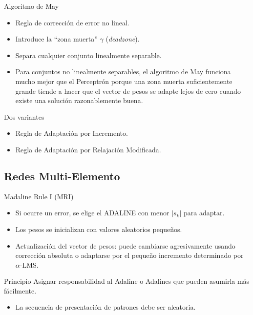 \documentclass[aspectratio=169,utf8,spanish]{beamer}
\begin{document}
\begin{frame}{Algoritmo de May}
  \begin{itemize}
    \item Regla de corrección de error no lineal.
    \item Introduce la ``zona muerta'' $\gamma$ (\textit{deadzone}).
    \item Separa cualquier conjunto linealmente separable.
    \item Para conjuntos no linealmente separables, el algoritmo de May funciona mucho mejor que el Perceptrón porque una zona muerta suficientemente grande tiende a hacer que el vector de pesos se adapte lejos de cero cuando existe una solución razonablemente buena.
  \end{itemize}

  \begin{block}{Dos variantes}
    \begin{itemize}
      \item Regla de Adaptación por Incremento.
      \item Regla de Adaptación por Relajación Modificada.
    \end{itemize}
  \end{block}
\end{frame}


\subsection{Redes Multi-Elemento}

\begin{frame}{Madaline Rule I (MRI)}
  \begin{itemize}
    \item Si ocurre un error, se elige el ADALINE con menor $|s_k|$ para adaptar.
    \item Los pesos se inicializan con valores aleatorios pequeños.
    \item Actualización del vector de pesos: puede cambiarse agresivamente usando corrección absoluta o adaptarse por el pequeño incremento determinado por $\alpha$-LMS.
  \end{itemize}

  \begin{block}{Principio}
    Asignar responsabilidad al Adaline o Adalines que pueden asumirla más fácilmente.
  \end{block}

  \begin{itemize}
    \item La secuencia de presentación de patrones debe ser aleatoria.
  \end{itemize}
\end{frame}
\end{document}
